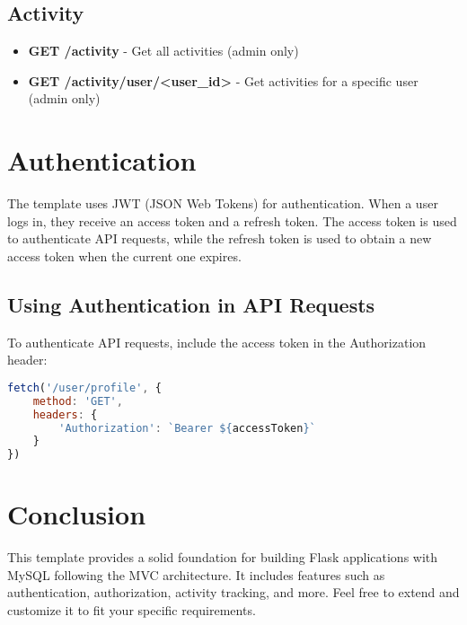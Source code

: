 \documentclass{article}
\begin{document}
\subsection{Activity}

\begin{itemize}
    \item \textbf{GET /activity} - Get all activities (admin only)
    \item \textbf{GET /activity/user/<user\_id>} - Get activities for a specific user (admin only)
\end{itemize}

\section{Authentication}

The template uses JWT (JSON Web Tokens) for authentication. When a user logs in, they receive an access token and a refresh token. The access token is used to authenticate API requests, while the refresh token is used to obtain a new access token when the current one expires.

\subsection{Using Authentication in API Requests}

To authenticate API requests, include the access token in the Authorization header:

\begin{lstlisting}[language=javascript]
fetch('/user/profile', {
    method: 'GET',
    headers: {
        'Authorization': `Bearer ${accessToken}`
    }
})
\end{lstlisting}

\section{Conclusion}

This template provides a solid foundation for building Flask applications with MySQL following the MVC architecture. It includes features such as authentication, authorization, activity tracking, and more. Feel free to extend and customize it to fit your specific requirements.
\end{document}
